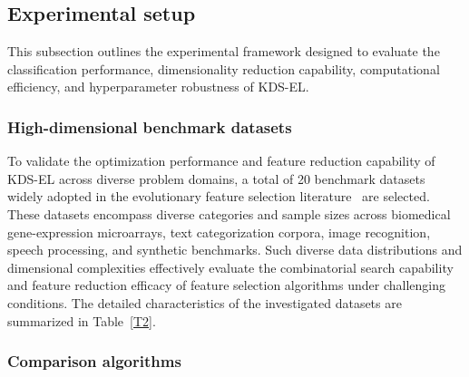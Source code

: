 \subsection{Experimental setup}\label{sec:setup}

This subsection outlines the experimental framework designed to evaluate the classification performance, dimensionality reduction capability, computational efficiency, and hyperparameter robustness of KDS-EL.

\subsubsection{High-dimensional benchmark datasets}

To validate the optimization performance and feature reduction capability of KDS-EL across diverse problem domains, a total of 20 benchmark datasets widely adopted in the evolutionary feature selection literature~\cite{mel2024,wangjia2022,wei2025} are selected. These datasets encompass diverse categories and sample sizes across biomedical gene-expression microarrays, text categorization corpora, image recognition, speech processing, and synthetic benchmarks. Such diverse data distributions and dimensional complexities effectively evaluate the combinatorial search capability and feature reduction efficacy of feature selection algorithms under challenging conditions. The detailed characteristics of the investigated datasets are summarized in Table~\ref{T2}.

\subsubsection{Comparison algorithms}

